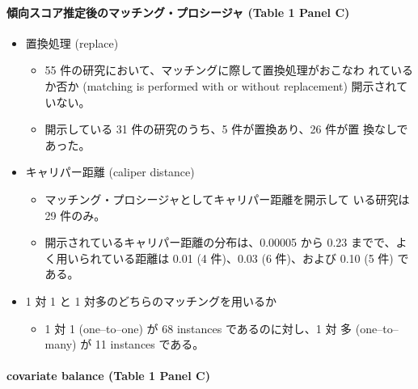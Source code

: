 \paragraph{傾向スコア推定後のマッチング・プロシージャ (Table 1 Panel C)}

\begin{itemize}
 \item 置換処理 (replace)
       \begin{itemize}
        \item 55 件の研究において、マッチングに際して置換処理がおこなわ
              れているか否か (matching is performed with or without
              replacement) 開示されていない。
        \item 開示している 31 件の研究のうち、5 件が置換あり、26 件が置
              換なしであった。
       \end{itemize}
 \item キャリパー距離 (caliper distance)
       \begin{itemize}
        \item マッチング・プロシージャとしてキャリパー距離を開示して
              いる研究は 29 件のみ。
        \item 開示されているキャリパー距離の分布は、0.00005 から
              0.23 までで、よく用いられている距離は 0.01 (4 件)、0.03 (6
              件)、および 0.10 (5 件) である。
       \end{itemize}
 \item 1 対 1 と 1 対多のどちらのマッチングを用いるか
       \begin{itemize}
        \item 1 対 1 (one--to--one) が 68 instances であるのに対し、1 対
              多 (one--to--many) が 11 instances である。
       \end{itemize}
\end{itemize}

\paragraph{covariate balance (Table 1 Panel C)}

